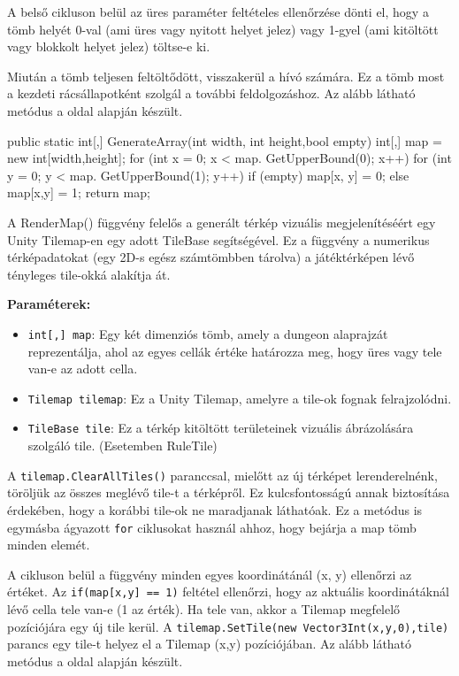 A belső cikluson belül az üres paraméter feltételes ellenőrzése dönti el, hogy a tömb helyét 0-val (ami üres vagy nyitott helyet jelez) vagy 1-gyel (ami kitöltött vagy blokkolt helyet jelez) töltse-e ki.

Miután a tömb teljesen feltöltődött, visszakerül a hívó számára. Ez a tömb most a kezdeti rácsállapotként szolgál a további feldolgozáshoz. Az alább látható metódus a \cite{mapgenerator} oldal alapján készült.

\begin{java}
public static int[,] GenerateArray(int width, 
    int height,bool empty)
{
    int[,] map = new int[width,height];
    for (int x = 0; x < map.
        GetUpperBound(0); x++)
    {
        for (int y = 0; y < map.
            GetUpperBound(1); y++)
        {
            if (empty)
            {
                map[x, y] = 0;
            }
            else
            {
                map[x,y] = 1;
            }
        }
    }
    return map;
}
\end{java}


A RenderMap() függvény felelős a generált térkép vizuális megjelenítéséért egy Unity Tilemap-en egy adott TileBase segítségével. Ez a függvény a numerikus térképadatokat (egy 2D-s egész számtömbben tárolva) a játéktérképen lévő tényleges tile-okká alakítja át.

\textbf{Paraméterek:}
\begin{itemize}
\item \texttt{int[,] map}: Egy két dimenziós tömb, amely a dungeon alaprajzát reprezentálja, ahol az egyes cellák értéke határozza meg, hogy üres vagy tele van-e az adott cella.
\item \texttt{Tilemap tilemap}: Ez a Unity Tilemap, amelyre a tile-ok fognak felrajzolódni.
\item \texttt{TileBase tile}: Ez a térkép kitöltött területeinek vizuális ábrázolására szolgáló tile. (Esetemben RuleTile)
\end{itemize}

A \texttt{tilemap.ClearAllTiles()} paranccsal, mielőtt az új térképet lerenderelnénk, töröljük az összes meglévő tile-t a térképről. Ez kulcsfontosságú annak biztosítása érdekében, hogy a korábbi tile-ok ne maradjanak láthatóak. Ez a metódus is egymásba ágyazott \texttt{for} ciklusokat használ ahhoz, hogy bejárja a map tömb minden elemét. 

A cikluson belül a függvény minden egyes koordinátánál (x, y) ellenőrzi az értéket. Az \texttt{if(map[x,y] == 1)} feltétel ellenőrzi, hogy az aktuális koordinátáknál lévő cella tele van-e (1 az érték). Ha tele van, akkor a Tilemap megfelelő pozíciójára egy új tile kerül. A \texttt{tilemap.SetTile(new Vector3Int(x,y,0),tile)} parancs egy tile-t helyez el a Tilemap (x,y) pozíciójában. Az alább látható metódus a \cite{mapgenerator} oldal alapján készült.

